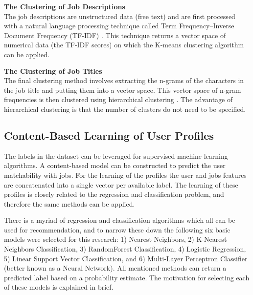 \noindent
\textbf{The Clustering of Job Descriptions} \\
The job descriptions are unstructured data (free text) and are first processed with a natural language processing technique called Term Frequency–Inverse Document Frequency (TF-IDF) \cite{ramos2003using}. 
This technique returns a vector space of numerical data (the TF-IDF scores) on which the K-means clustering algorithm \cite{hartigan1979algorithm} can be applied. 

\noindent
\textbf{The Clustering of Job Titles} \\
The final clustering method involves extracting the n-grams of the characters in the job title and putting them into a vector space.
This vector space of n-gram frequencies is then clustered using hierarchical clustering \cite{rokach2005clustering}. 
The advantage of hierarchical clustering is that the number of clusters do not need to be specified. 

\subsection{Content-Based Learning of User Profiles} 
\label{ssec:cblup}
The labels in the dataset can be leveraged for supervised machine learning algorithms. 
A content-based model can be constructed to predict the user matchability with jobs. 
For the learning of the profiles the user and jobs features are concatenated into a single vector per available label. 
The learning of these profiles is closely related to the regression and classification problem, and therefore the same methods can be applied. 

There is a myriad of regression and classification algorithms which all can be used for recommendation, and to narrow these down the following six basic models were selected for this research: 1) Nearest Neighbors, 2) K-Nearest Neighbors Classification, 3) RandomForest Classification, 4) Logistic Regression, 5) Linear Support Vector Classification, and 6) Multi-Layer Perceptron Classifier (better known as a Neural Network).
All mentioned methods can return a predicted label based on a probability estimate.
The motivation for selecting each of these models is explained in brief.

